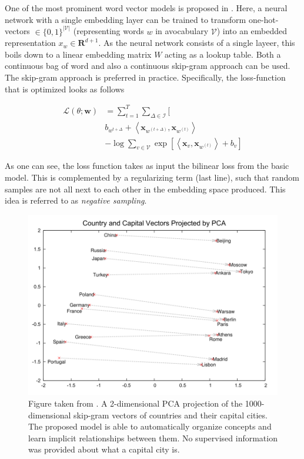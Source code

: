 \documentclass[a4paper,12pt,oneside,openright]{report}
\begin{document}
One of the most prominent word vector models is proposed in \cite{mikolov13, mikolov13b}.
Here, a neural network with a single embedding layer can be trained to transform one-hot-vectors $\in \{ 0, 1 \}^{| \mathcal{V} |}$ (representing words $w$ in avocabulary $\mathcal{V}$)
into an embedded representation $x_w \in \mathbf{R}^{d + 1}$.
As the neural network consists of a single layeer, this boils down to a linear embedding matrix $W$ acting as a lookup table.
Both a continuous bag of word and also a continuous skip-gram approach can be used.
The skip-gram approach is preferred in practice.
Specifically, the loss-function that is optimized looks as follows

\begin{align} 
\mathcal{L}(\theta ; \mathbf{w}) & =\sum_{t=1}^{T} \sum_{\Delta \in \mathcal{I}} [ \nonumber \\ 
& b_{w^{t+\Delta}} +\left\langle \mathbf{x}_{w^{(t+\Delta)}}, \mathbf{x}_{w^{(t)}} \right\rangle \nonumber  \\
& -\log \sum_{v \in \mathcal{V}} \exp \left[\left\langle\mathbf{x}_{v}, \mathbf{x}_{w^{(t)}}\right\rangle+b_{v} \right] 
\end{align}

As one can see, the loss function takes as input the bilinear loss from the basic model.
This is complemented by a regularizing term (last line), such that random samples are not all next to each other in the embedding space produced.
This idea is referred to as \textit{negative sampling}.

\begin{figure}[h]
	\center
  \includegraphics[width=0.6\linewidth]{./assets/background/word2vec_cities.png}
  \caption{Figure taken from \cite{mikolov13b}. A 2-dimensional PCA projection of the 1000-dimensional skip-gram vectors of countries and their capital cities. The proposed model is able to automatically organize concepts and learn implicit relationships between them. No supervised information was provided about what a capital city is.}
  \label{fig:cbow_skipgram}
\end{figure}
\end{document}
